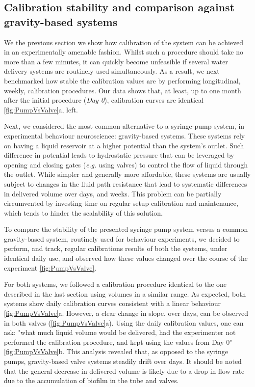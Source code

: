 \subsection*{Calibration stability and comparison against gravity-based systems}

We the previous section we show how calibration of the system can be achieved in an experimentally amenable fashion. Whilst such a procedure should take no more than a few minutes, it can quickly become unfeasible if several water delivery systems are routinely used simultaneously. As a result, we next benchmarked how stable the calibration values are by performing longitudinal, weekly, calibration procedures. Our data shows that, at least, up to one month after the initial procedure (\textit{Day 0}), calibration curves are identical \ref{fig:PumpVsValve}a, left.

Next, we considered the most common alternative to a syringe-pump system, in experimental behaviour neuroscience: gravity-based systems. These systems rely on having a liquid reservoir at a higher potential than the system's outlet. Such difference in potential leads to hydrostatic pressure that can be leveraged by opening and closing gates (\textit{e.g.} using valves) to control the flow of liquid through the outlet. While simpler and generally more affordable, these systems are usually subject to changes in the fluid path resistance that lead to systematic differences in delivered volume over days, and weeks. This problem can be partially circumvented by investing time on regular setup calibration and maintenance, which tends to hinder the scalability of this solution.

To compare the stability of the presented syringe pump system versus a common gravity-based system, routinely used for behaviour experiments, we decided to perform, and track, regular calibrations results of both the systems, under identical daily use, and observed how these values changed over the course of the experiment \ref{fig:PumpVsValve}.

For both systems, we followed a calibration procedure identical to the one described in the last section using volumes in a similar range. As expected, both systems show daily calibration curves consistent with a linear behaviour \ref{fig:PumpVsValve}a. However, a clear change in slope, over days, can be observed in both valves (\ref{fig:PumpVsValve}a). Using the daily calibration values, one can ask: "what much liquid volume would be delivered, had the experimenter not performed the calibration procedure, and kept using the values from Day 0" \ref{fig:PumpVsValve}b. This analysis revealed that, as opposed to the syringe pumps, gravity-based valve systems steadily drift over days. It should be noted that the general decrease in delivered volume is likely due to a drop in flow rate due to the accumulation of biofilm in the tube and valves. 

